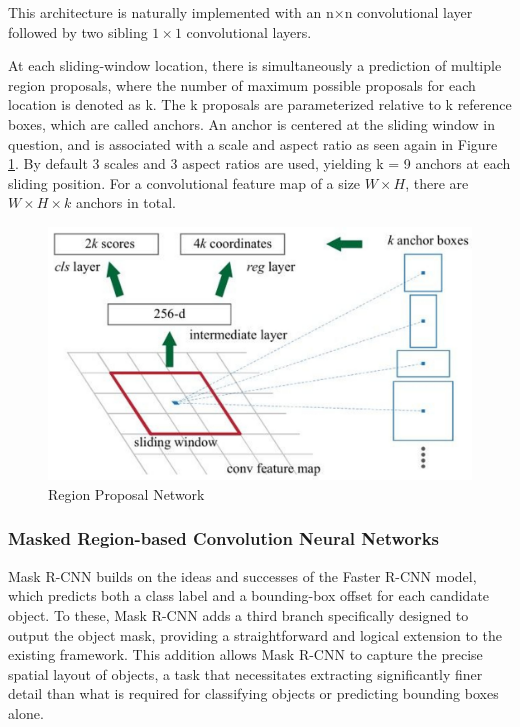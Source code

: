 This architecture is naturally implemented with an n×n convolutional layer followed by two sibling $1 \times 1$ convolutional layers. 

\newpage
At each sliding-window 
location, there is simultaneously a prediction of multiple region proposals, where the number of maximum possible proposals for each location is
denoted as k. The k proposals are parameterized relative to k reference boxes, which are called  anchors. An anchor is centered at the sliding window
in question, and is associated with a scale and aspect ratio as seen again in Figure \ref{fig:anchors}. By default 3 scales and 3 aspect ratios are used, 
yielding k = 9 anchors at each sliding position. For a convolutional feature map of a size $W \times H$, there are $W \times H \times k$ anchors in total.

\begin{figure}
    \centering
    \includegraphics[scale=0.1]{Figures/anchors.jpeg}
    \caption{Region Proposal Network}
    \label{fig:anchors}
\end{figure}


\subsubsection{Masked Region-based Convolution Neural Networks}

Mask R-CNN builds on the ideas and successes of the Faster R-CNN model, which predicts both a class label and a bounding-box offset for each candidate object. 
To these, Mask R-CNN adds a third branch specifically designed to output the object mask, providing a straightforward and logical extension to the 
existing framework. This addition allows Mask R-CNN to capture the precise spatial layout of objects, a task that necessitates extracting significantly 
finer detail than what is required for classifying objects or predicting bounding boxes alone.


